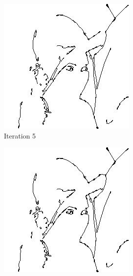\documentclass{llncs}
\begin{document}
\begin{figure}
        \begin{subfigure}[b]{0.3\textwidth}
                \includegraphics[width=\textwidth]{IMG/HeuristicInit/Iteration5}
                \caption{Iteration 5}
                \label{fig:heu_iter5}
        \end{subfigure}%
        \quad
        \begin{subfigure}[b]{0.3\textwidth}
                \includegraphics[width=\textwidth]{IMG/HeuristicInit/Iteration6}

\end{subfigure}
\end{figure}
\end{document}
